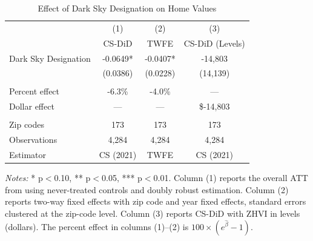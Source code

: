 
\begin{table}[H]
\centering
\caption{Effect of Dark Sky Designation on Home Values}
\label{tab:main}
\begin{threeparttable}
\begin{tabular}{lccc}
\toprule
 & (1) & (2) & (3) \\
 & CS-DiD & TWFE & CS-DiD (Levels) \\
\midrule
Dark Sky Designation & -0.0649* & -0.0407* & -14,803 \\
 & (0.0386) & (0.0228) & (14,139) \\
\\
Percent effect & -6.3\% &  -4.0\% & --- \\
Dollar effect & --- & --- & \$-14,803 \\
\\
Zip codes & 173 & 173 & 173 \\
Observations & 4,284 & 4,284 & 4,284 \\
Estimator & CS (2021) & TWFE & CS (2021) \\
\bottomrule
\end{tabular}
\begin{tablenotes}[flushleft]
\small
\item \textit{Notes:} * p$<$0.10, ** p$<$0.05, *** p$<$0.01. Column (1) reports the overall ATT from \citet{callaway2021difference} using never-treated controls and doubly robust estimation. Column (2) reports two-way fixed effects with zip code and year fixed effects, standard errors clustered at the zip-code level. Column (3) reports CS-DiD with ZHVI in levels (dollars). The percent effect in columns (1)--(2) is $100 \times (e^{\hat{\beta}} - 1)$.
\end{tablenotes}
\end{threeparttable}
\end{table}
